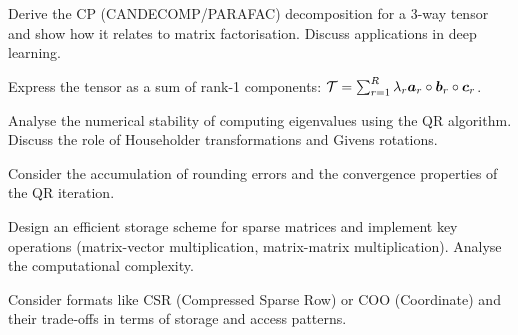 \begin{exercisebox}[hard]
\begin{problem}
Derive the CP (CANDECOMP/PARAFAC) decomposition for a 3-way tensor and show how it relates to matrix factorisation. Discuss applications in deep learning.
\end{problem}
\begin{hintbox}
Express the tensor as a sum of rank-1 components: $\mathcal{T} = \sum_{r=1}^R \lambda_r \boldsymbol{a}_r \circ \boldsymbol{b}_r \circ \boldsymbol{c}_r$.
\end{hintbox}
\end{exercisebox}


\begin{exercisebox}[hard]
\begin{problem}
Analyse the numerical stability of computing eigenvalues using the QR algorithm. Discuss the role of Householder transformations and Givens rotations.
\end{problem}
\begin{hintbox}
Consider the accumulation of rounding errors and the convergence properties of the QR iteration.
\end{hintbox}
\end{exercisebox}


\begin{exercisebox}[hard]
\begin{problem}
Design an efficient storage scheme for sparse matrices and implement key operations (matrix-vector multiplication, matrix-matrix multiplication). Analyse the computational complexity.
\end{problem}
\begin{hintbox}
Consider formats like CSR (Compressed Sparse Row) or COO (Coordinate) and their trade-offs in terms of storage and access patterns.
\end{hintbox}
\end{exercisebox}


